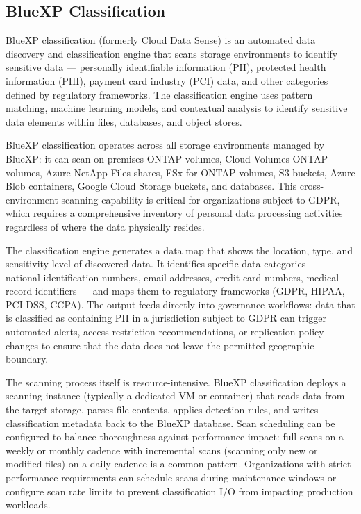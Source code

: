 \subsection{BlueXP Classification}

BlueXP classification (formerly Cloud Data Sense) is an automated data
discovery and classification engine that scans storage environments to identify
sensitive data --- personally identifiable information (PII), protected health
information (PHI), payment card industry (PCI) data, and other categories
defined by regulatory frameworks. The classification engine uses pattern
matching, machine learning models, and contextual analysis to identify
sensitive data elements within files, databases, and object stores.

BlueXP classification operates across all storage environments managed by
BlueXP: it can scan on-premises ONTAP volumes, Cloud Volumes ONTAP volumes,
Azure NetApp Files shares, FSx for ONTAP volumes, S3 buckets, Azure Blob
containers, Google Cloud Storage buckets, and databases. This
cross-environment scanning capability is critical for organizations subject to
GDPR, which requires a comprehensive inventory of personal data processing
activities regardless of where the data physically resides.

The classification engine generates a data map that shows the location, type,
and sensitivity level of discovered data. It identifies specific data
categories --- national identification numbers, email addresses, credit card
numbers, medical record identifiers --- and maps them to regulatory frameworks
(GDPR, HIPAA, PCI-DSS, CCPA). The output feeds directly into governance
workflows: data that is classified as containing PII in a jurisdiction subject
to GDPR can trigger automated alerts, access restriction recommendations, or
replication policy changes to ensure that the data does not leave the
permitted geographic boundary.

The scanning process itself is resource-intensive. BlueXP classification
deploys a scanning instance (typically a dedicated VM or container) that reads
data from the target storage, parses file contents, applies detection rules,
and writes classification metadata back to the BlueXP database. Scan
scheduling can be configured to balance thoroughness against performance
impact: full scans on a weekly or monthly cadence with incremental scans
(scanning only new or modified files) on a daily cadence is a common pattern.
Organizations with strict performance requirements can schedule scans during
maintenance windows or configure scan rate limits to prevent classification
I/O from impacting production workloads.

